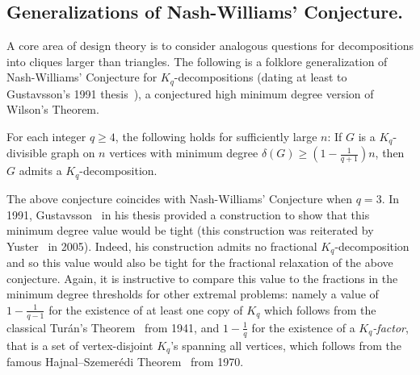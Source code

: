 \documentclass[twoside,leqno]{article}
\begin{document}
\subsection{Generalizations of Nash-Williams' Conjecture.} A core area of design theory is to consider analogous questions for decompositions into cliques larger than triangles. The following is a folklore generalization of Nash-Williams' Conjecture for $K_q$-decompositions (dating at least to Gustavsson's 1991 thesis~\cite{gustavsson1991decompositions}), a conjectured high minimum degree version of Wilson's Theorem.

\begin{conj}[Folklore]\label{conj:Folklore}
For each integer $q\ge 4$, the following holds for sufficiently large $n$: If $G$ is a $K_q$-divisible graph on $n$ vertices with minimum degree $\delta (G) \geq \left(1-\frac{1}{q+1}\right)n$,  then $G$ admits a $K_q$-decomposition.
\end{conj}

The above conjecture coincides with Nash-Williams' Conjecture when $q=3$. In 1991, Gustavsson~\cite{gustavsson1991decompositions} in his thesis provided a construction to show that this minimum degree value would be tight (this construction was reiterated by Yuster~\cite{Yuster2005asymptotically} in 2005). Indeed, his construction admits no fractional $K_q$-decomposition and so this value would also be tight for the fractional relaxation of the above conjecture. Again, it is instructive to compare this value to the fractions in the minimum degree thresholds for other extremal problems: namely a value of $1-\frac{1}{q-1}$ for the existence of at least one copy of $K_q$ which follows from the classical Tur\'an's Theorem~\cite{turan1941extremal} from 1941, and $1-\frac{1}{q}$ for the existence of a \emph{$K_q$-factor}, that is a set of vertex-disjoint $K_q$'s spanning all vertices, which follows from the famous Hajnal--Szemer\'edi Theorem~\cite{HS70} from 1970.  
\end{document}
